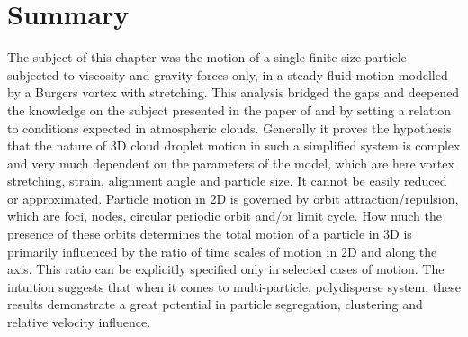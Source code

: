 \documentclass[../main.tex]{subfiles}
\begin{document}
\section{Summary}
The subject of this chapter was the motion of a single finite-size particle subjected to viscosity and gravity forces only, in a steady fluid motion modelled by a Burgers vortex with stretching. This analysis bridged the gaps and deepened the knowledge on the subject presented in the paper of \citet{Marcu1995} and by setting a relation to conditions expected in atmospheric clouds.
Generally it proves the hypothesis that the nature of 3D cloud droplet motion in such a simplified system is complex and very much dependent on the parameters of the model, which are here vortex stretching, strain, alignment angle and particle size. It cannot be easily reduced or approximated. Particle motion in 2D is governed by orbit attraction/repulsion, which are foci, nodes, circular periodic orbit and/or limit cycle. How much the presence of these orbits determines the total motion of a particle in 3D is primarily influenced by the ratio of time scales of motion in 2D and along the axis. This ratio can be explicitly specified only in selected cases of motion. The intuition suggests that when it comes to multi-particle, polydisperse system, these results demonstrate a great potential in particle segregation, clustering and relative velocity influence.
\end{document}
